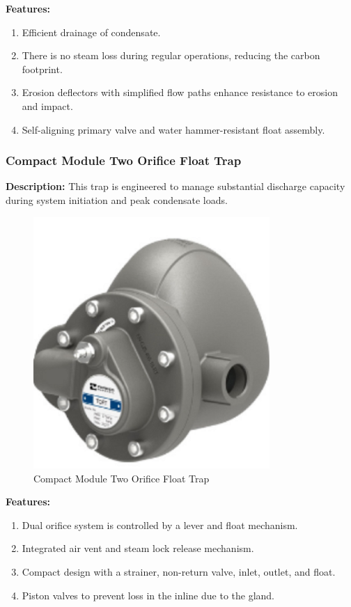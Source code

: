 \textbf{Features:}
\begin{enumerate}
    \item Efficient drainage of condensate.
    \item There is no steam loss during regular operations, reducing the carbon footprint.
    \item Erosion deflectors with simplified flow paths enhance resistance to erosion and impact.
    \item Self-aligning primary valve and water hammer-resistant float assembly.
\end{enumerate}
\subsubsection{Compact Module Two Orifice Float Trap}

\textbf{Description:} This trap is engineered to manage substantial discharge capacity during system initiation and peak condensate loads.

\begin{figure}[h]
    \centering
    \includegraphics[width=0.8\textwidth,height=0.33\textheight,keepaspectratio]{figs/lastmin/two_orific_float_trap.png}
    \caption{Compact Module Two Orifice Float Trap}
    \label{fig:compact_module_two_orifice_float_trap}
\end{figure}

\textbf{Features:}
\begin{enumerate}
    \item Dual orifice system is controlled by a lever and float mechanism.
    \item Integrated air vent and steam lock release mechanism.
    \item Compact design with a strainer, non-return valve, inlet, outlet, and float.
    \item Piston valves to prevent loss in the inline due to the gland.
\end{enumerate}
